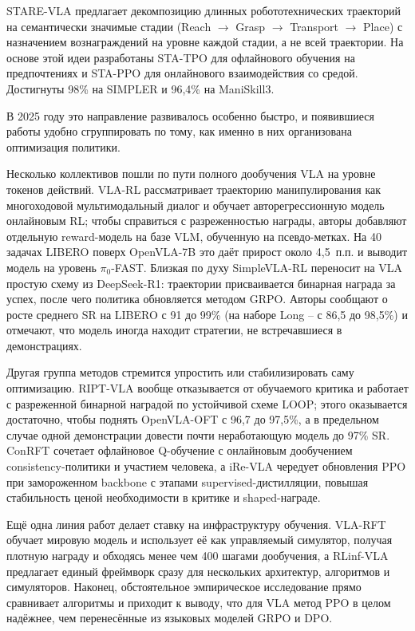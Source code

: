     STARE-VLA \cite{starevla2025} предлагает декомпозицию длинных робототехнических траекторий на семантически значимые стадии (Reach $\to$ Grasp $\to$ Transport $\to$ Place) с назначением вознаграждений на уровне каждой стадии, а не всей траектории. На основе этой идеи разработаны STA-TPO для офлайнового обучения на предпочтениях и STA-PPO для онлайнового взаимодействия со средой. Достигнуты 98\% на SIMPLER и 96,4\% на ManiSkill3.

    В 2025 году это направление развивалось особенно быстро, и появившиеся работы удобно сгруппировать по тому, как именно в них организована оптимизация политики.

    Несколько коллективов пошли по пути полного дообучения VLA на уровне токенов действий. VLA-RL \cite{vlarl2025} рассматривает траекторию манипулирования как многоходовой мультимодальный диалог и обучает авторегрессионную модель онлайновым RL; чтобы справиться с разреженностью награды, авторы добавляют отдельную reward-модель на базе VLM, обученную на псевдо-метках. На 40 задачах LIBERO поверх OpenVLA-7B это даёт прирост около 4,5~п.п. и выводит модель на уровень $\pi_0$-FAST. Близкая по духу SimpleVLA-RL \cite{simplevlarl2025} переносит на VLA простую схему из DeepSeek-R1: траектории присваивается бинарная награда за успех, после чего политика обновляется методом GRPO. Авторы сообщают о росте среднего SR на LIBERO с 91 до 99\% (на наборе Long -- с 86,5 до 98,5\%) и отмечают, что модель иногда находит стратегии, не встречавшиеся в демонстрациях.

    Другая группа методов стремится упростить или стабилизировать саму оптимизацию. RIPT-VLA \cite{riptvla2025} вообще отказывается от обучаемого критика и работает с разреженной бинарной наградой по устойчивой схеме LOOP; этого оказывается достаточно, чтобы поднять OpenVLA-OFT с 96,7 до 97,5\%, а в предельном случае одной демонстрации довести почти неработающую модель до 97\% SR. ConRFT \cite{conrft2025} сочетает офлайновое Q-обучение с онлайновым дообучением consistency-политики и участием человека, а iRe-VLA \cite{irevla2024} чередует обновления PPO при замороженном backbone с этапами supervised-дистилляции, повышая стабильность ценой необходимости в критике и shaped-награде.

    Ещё одна линия работ делает ставку на инфраструктуру обучения. VLA-RFT \cite{vlarft2025} обучает мировую модель и использует её как управляемый симулятор, получая плотную награду и обходясь менее чем 400 шагами дообучения, а RLinf-VLA \cite{rlinfvla2025} предлагает единый фреймворк сразу для нескольких архитектур, алгоритмов и симуляторов. Наконец, обстоятельное эмпирическое исследование \cite{rlvla_study2025} прямо сравнивает алгоритмы и приходит к выводу, что для VLA метод PPO в целом надёжнее, чем перенесённые из языковых моделей GRPO и DPO.

